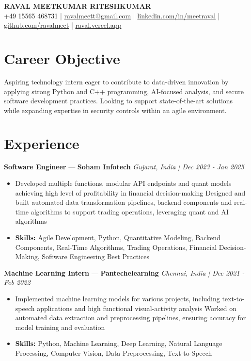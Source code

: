 \documentclass[a4paper,10pt]{article}
\begin{document}
\begin{center}
  {\Large\bfseries RAVAL MEETKUMAR RITESHKUMAR}\\[2pt]
  {\small +49 15565 468731 \;|\; \href{mailto:ravalmeett@gmail.com}{ravalmeett@gmail.com} \;|\; \href{https://www.linkedin.com/in/meetraval/}{linkedin.com/in/meetraval} \;|\; \href{https://github.com/ravalmeet}{github.com/ravalmeet} \;|\; \href{https://raval.vercel.app/}{raval.vercel.app}}
\end{center}
\vspace{-3pt}

\section*{Career Objective}
Aspiring technology intern eager to contribute to data-driven innovation by applying strong Python and C++ programming, AI-focused analysis, and secure software development practices. Looking to support state-of-the-art solutions while expanding expertise in security controls within an agile environment.\par

\section*{Experience}
\textbf{Software Engineer} — \textbf{Soham Infotech} \hfill \textit{Gujarat, India \;|\; Dec 2023 - Jan 2025}\par
\vspace{1pt}
\begin{itemize}
  \item Developed multiple functions, modular API endpoints and quant models achieving high level of profitability in financial decision-making Designed and built automated data transformation pipelines, backend components and real-time algorithms to support trading operations, leveraging quant and AI algorithms
  \item \textbf{Skills:} Agile Development, Python, Quantitative Modeling, Backend Components, Real-Time Algorithms, Trading Operations, Financial Decision-Making, Software Engineering Best Practices
\end{itemize}
\vspace{3pt}
\textbf{Machine Learning Intern} — \textbf{Pantechelearning} \hfill \textit{Chennai, India \;|\; Dec 2021 - Feb 2022}\par
\vspace{1pt}
\begin{itemize}
  \item Implemented machine learning models for various projects, including text-to-speech applications and high functional visual-activity analysis Worked on automated data extraction and preprocessing pipelines, ensuring accuracy for model training and evaluation
  \item \textbf{Skills:} Python, Machine Learning, Deep Learning, Natural Language Processing, Computer Vision, Data Preprocessing, Text-to-Speech
\end{itemize}
\end{document}
